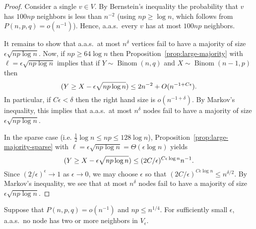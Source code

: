 \documentclass[EJP]{ejpecp}
\newcommand{\1}[1]{\mathbbm{1}_{\{#1\}}}
\let\Pr\relax
\DeclareMathOperator{\Pr}{Pr}
\DeclareMathOperator{\Binom}{Binom}
\begin{document}
\begin{proof}
 Consider a single $v \in V$. By Bernstein's inequality
 the probability that $v$ has $100np$ neighbors is less than $n^{-2}$
 (using $np \ge \log n$, which follows from $P(n, p, q) = o(n^{-1})$).
 Hence, a.a.s.\ every $v$ has at most $100np$ neighbors.

 It remains to show that a.a.s.\ at most $n^\delta$ vertices
 fail to have a majority of size $\epsilon \sqrt{np \log n}$.
 Now, if $np \ge 64 \log n$ then Proposition~\ref{prop:large-majority}
 with $\ell = \epsilon \sqrt{np \log n}$ implies that
 if $Y \sim \Binom(n, q)$ and $X \sim \Binom(n-1, p)$ then
 \[
  \Pr(Y \ge X - \epsilon \sqrt{np \log n}) \le 2n^{-2} + O(n^{-1 + C \epsilon}).
 \]
 In particular, if $C\epsilon < \delta$ then the right hand size is
 $o(n^{-1 + \delta})$. By Markov's inequality, this implies that a.a.s.\ at most
 $n^{\delta}$ nodes fail to have a majority of size
 $\epsilon \sqrt{np \log n}$.

 In the sparse case (i.e. $\frac 12 \log n \le np \le 128 \log n$),
 Proposition~\ref{prop:large-majority-sparse} with
 $\ell = \epsilon \sqrt{np \log n} = \Theta(\epsilon \log n)$ yields
 \[
  \Pr(Y \ge X - \epsilon \sqrt{np \log n})
  \le (2C/\epsilon)^{C \epsilon \log n} n^{-1}.
 \]
 Since $(2/\epsilon)^{\epsilon} \to 1$ as $\epsilon \to 0$, we may choose
 $\epsilon$ so that $(2C/\epsilon)^{C \epsilon \log n} \le n^{\delta/2}$.
 By Markov's inequality, we see that at most $n^\delta$ nodes
 fail to have a majority of size $\epsilon \sqrt{np \log n}$.
\end{proof}


\begin{proposition}\label{prop:Ve-neighbors}
  Suppose that $P(n, p, q) = o(n^{-1})$ and $np \le n^{1/4}$.
  For sufficiently small $\epsilon$, a.a.s.\ no node has two or more neighbors in $V_\epsilon$.
\end{proposition}
\end{document}
